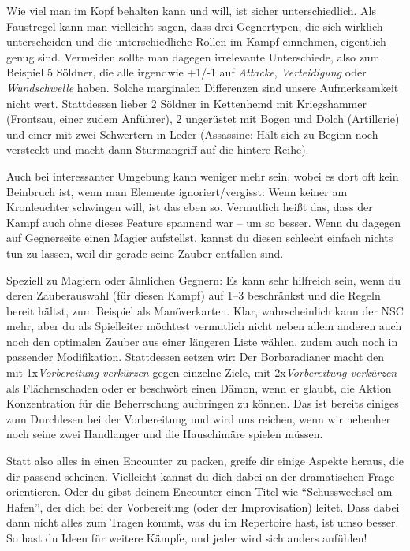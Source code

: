 Wie viel man im Kopf behalten kann und will, ist sicher unterschiedlich.
Als Faustregel kann man vielleicht sagen, dass drei Gegnertypen, die sich wirklich unterscheiden und die unterschiedliche Rollen im Kampf einnehmen, eigentlich genug sind.
Vermeiden sollte man dagegen irrelevante Unterschiede, also zum Beispiel 5 Söldner, die alle irgendwie +1/-1 auf \textit{Attacke}, \textit{Verteidigung} oder \textit{Wundschwelle} haben.
 Solche marginalen Differenzen sind unsere Aufmerksamkeit nicht wert. Stattdessen lieber 2 Söldner in Kettenhemd mit Kriegshammer (Frontsau, einer zudem Anführer), 2 ungerüstet mit Bogen und Dolch (Artillerie) und einer mit zwei Schwertern in Leder (Assassine: Hält sich zu Beginn noch versteckt und macht dann Sturmangriff auf die hintere Reihe).
 
  Auch bei interessanter Umgebung kann weniger mehr sein, wobei es dort oft kein Beinbruch ist, wenn man Elemente ignoriert/vergisst:
  Wenn keiner am Kronleuchter schwingen will, ist das eben so.
  Vermutlich heißt das, dass der Kampf auch ohne dieses Feature spannend war -- um so besser.
  Wenn du dagegen auf Gegnerseite einen Magier aufstellst, kannst du diesen schlecht einfach nichts tun zu lassen, weil dir gerade seine Zauber entfallen sind.

Speziell zu Magiern oder ähnlichen Gegnern:
Es kann sehr hilfreich sein, wenn du deren Zauberauswahl (für diesen Kampf) auf 1--3 beschränkst und die Regeln bereit hältst, zum Beispiel als Manöverkarten.
Klar, wahrscheinlich kann der NSC mehr, aber du als Spielleiter möchtest vermutlich nicht neben allem anderen auch noch den optimalen Zauber aus einer längeren Liste wählen, zudem auch noch in passender Modifikation.
Stattdessen setzen wir: Der Borbaradianer macht den  mit 1x\textit{Vorbereitung verkürzen} gegen einzelne Ziele,  mit 2x\textit{Vorbereitung verkürzen}  als Flächenschaden oder er beschwört einen Dämon, wenn er glaubt, die Aktion Konzentration für die Beherrschung aufbringen zu können.
Das ist bereits einiges zum Durchlesen bei der Vorbereitung und wird uns reichen, wenn wir nebenher noch seine zwei Handlanger und die Hauschimäre spielen müssen. 

Statt also alles in einen Encounter zu packen, greife dir einige Aspekte heraus, die dir passend scheinen. Vielleicht kannst du dich dabei an der dramatischen Frage orientieren.
Oder du gibst deinem Encounter einen Titel wie \enquote{Schusswechsel am Hafen}, der dich bei der Vorbereitung (oder der Improvisation) leitet.
Dass dabei dann nicht alles zum Tragen kommt, was du im Repertoire hast, ist umso besser.
So hast du Ideen für weitere Kämpfe, und jeder wird sich anders anfühlen!

